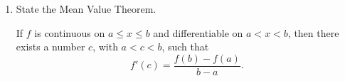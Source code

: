 \documentclass[11pt]{article}
\begin{document}
\begin{enumerate}
\item State the Mean Value Theorem.

  \vfill

  {\color{blue}

    If $f$ is continuous on $a\leq x\leq b$ and differentiable on $a<
    x < b$, then there exists a number $c$, with $a< c < b$, such that
    \[
    f'(c) = \frac{f(b)-f(a)}{b-a}.
    \]
    
  }

  \vfill

\end{enumerate}
\end{document}
